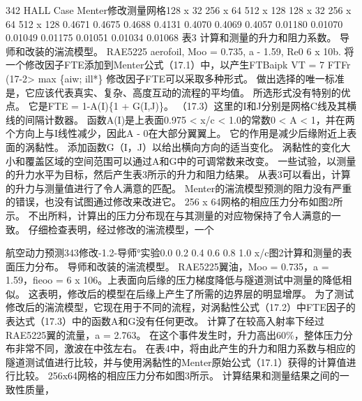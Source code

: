 \documentclass[UTF8,11pt,a4paper,openany,fontset=fandol]{ctexbook}
\begin{document}
342 HALL Case Menter修改测量网格128 x 32 256 x 64 512 x 128 128 x 32 256 x 64 512 x 128 0.4671 0.4675 0.4688 0.4131 0.4070 0.4069 0.4057 0.01180 0.01070 0.01049 0.01175 0.01051 0.01034 0.01068 表3 计算和测量的升力和阻力系数。 导师和改装的湍流模型。 RAE5225 aerofoil, Moo = 0.735, a - 1.59, Re0 6 x 10b. 将一个修改因子FTE添加到Menter公式（17.1）中，以产生FTBaipk VT = 7 FTFr (17-2> max \{aiw; ill*\} 修改因子FTE可以采取多种形式。 做出选择的唯一标准是，它应该代表真实、复杂、高度互动的流程的平均值。 所选形式没有特别的优点。 它是FTE = 1-A(I)\{1 + G(I,J)\}。 （17.3）这里的I和J分别是网格C线及其横线的间隔计数器。 函数A(I)是上表面0.975 < x/c < 1.0的常数0 < A < 1，并在两个方向上与I线性减少，因此A - 0在大部分翼翼上。 它的作用是减少后缘附近上表面的涡黏性。 添加函数G（I，J）以给出横向方向的适当变化。 涡黏性的变化大小和覆盖区域的空间范围可以通过A和G中的可调常数来改变。 一些试验，以测量的升力水平为目标，然后产生表3所示的升力和阻力结果。 从表3可以看出，计算的升力与测量值进行了令人满意的匹配。 Menter的湍流模型预测的阻力没有严重的错误，也没有试图通过修改来改进它。 256 x 64网格的相应压力分布如图2所示。 不出所料，计算出的压力分布现在与其测量的对应物保持了令人满意的一致。 仔细检查表明，经过修改的湍流模型，一个

航空动力预测343修改-1.2-导师°实验0.0 0.2 0.4 0.6 0.8 1.0 x/c图2计算和测量的表面压力分布。 导师和改装的湍流模型。 RAE5225翼油，Moo = 0.735，a = 1.59，fieoo = 6 x 106。上表面向后缘的压力梯度降低与隧道测试中测量的降低相似。 这表明，修改后的模型在后缘上产生了所需的边界层的明显增厚。 为了测试修改后的湍流模型，它现在用于不同的流程，对涡黏性公式（17.2）中FTE因子的表达式（17.3）中的函数A和G没有任何更改。 计算了在较高入射率下经过RAE5225翼的流量，a = 2.763。 在这个事件发生时，升力高出60\%，整体压力分布非常不同，激波在中弦左右。 在表4中，将由此产生的升力和阻力系数与相应的隧道测试值进行比较，并与使用涡黏性的Menter原始公式（17.1）获得的计算值进行比较。 256x64网格的相应压力分布如图3所示。 计算结果和测量结果之间的一致性质量，
\end{document}
